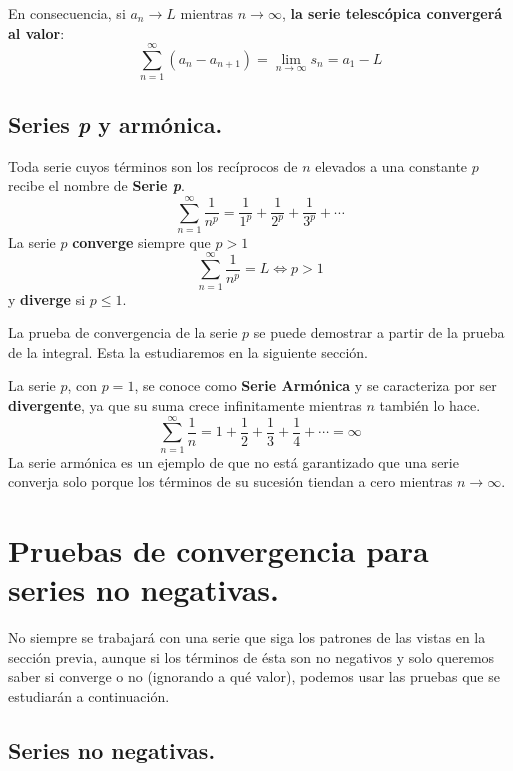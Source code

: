 \documentclass[12pt]{article}
\begin{document}
En consecuencia, si $a_{n} \to L$ mientras $n \to \infty$, \textbf{la serie telescópica convergerá al valor}:
\[
  \sum_{n = 1}^{\infty} (a_{n} - a_{n + 1}) = \lim_{n \to \infty} s_{n} = a_{1} - L
\]

\subsection{Series \textit{p} y armónica.}

Toda serie cuyos términos son los recíprocos de $n$ elevados a una constante $p$ recibe el nombre de \textbf{Serie \textit{p}}.
\[
  \sum_{n = 1}^{\infty} \frac{1}{n^{p}} = \frac{1}{1^{p}} + \frac{1}{2^{p}} + \frac{1}{3^{p}} + \cdots
\]
La serie $p$ \textbf{converge} siempre que $p > 1$
\[
  \sum_{n = 1}^{\infty} \frac{1}{n^{p}} = L \iff p > 1
\]
y \textbf{diverge} si $p \leq 1$.

La prueba de convergencia de la serie $p$ se puede demostrar a partir de la prueba de la integral. Esta la estudiaremos en la siguiente sección.

La serie $p$, con $p = 1$, se conoce como \textbf{Serie Armónica} y se caracteriza por ser \textbf{divergente}, ya que su suma crece infinitamente mientras $n$ también lo hace.
\[
  \sum_{n = 1}^{\infty} \frac{1}{n} = 1 + \frac{1}{2} + \frac{1}{3} + \frac{1}{4} + \cdots  = \infty
\]
La serie armónica es un ejemplo de que no está garantizado que una serie converja solo porque los términos de su sucesión tiendan a cero mientras $n \to \infty$.


\section{Pruebas de convergencia para series no negativas.}

No siempre se trabajará con una serie que siga los patrones de las vistas en la sección previa, aunque si los términos de ésta son no negativos y solo queremos saber si converge o no (ignorando a qué valor), podemos usar las pruebas que se estudiarán a continuación. 

\subsection{Series no negativas.}
\end{document}
